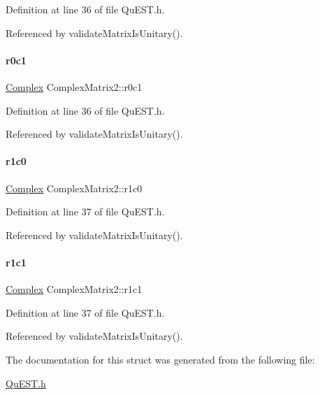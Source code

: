 Definition at line 36 of file Qu\+E\+S\+T.\+h.



Referenced by validate\+Matrix\+Is\+Unitary().

\mbox{\label{structComplexMatrix2_a0f3932f055a8b05cef361bce25d51172}} 
\paragraph{\texorpdfstring{r0c1}{r0c1}}
{\footnotesize\ttfamily \mbox{\hyperlink{structComplex}{Complex}} Complex\+Matrix2\+::r0c1}



Definition at line 36 of file Qu\+E\+S\+T.\+h.



Referenced by validate\+Matrix\+Is\+Unitary().

\mbox{\label{structComplexMatrix2_ab98282015ed2065e53fbc9638e2583ab}} 
\paragraph{\texorpdfstring{r1c0}{r1c0}}
{\footnotesize\ttfamily \mbox{\hyperlink{structComplex}{Complex}} Complex\+Matrix2\+::r1c0}



Definition at line 37 of file Qu\+E\+S\+T.\+h.



Referenced by validate\+Matrix\+Is\+Unitary().

\mbox{\label{structComplexMatrix2_a763007c3070802373549ba0350f83c8a}} 
\paragraph{\texorpdfstring{r1c1}{r1c1}}
{\footnotesize\ttfamily \mbox{\hyperlink{structComplex}{Complex}} Complex\+Matrix2\+::r1c1}



Definition at line 37 of file Qu\+E\+S\+T.\+h.



Referenced by validate\+Matrix\+Is\+Unitary().



The documentation for this struct was generated from the following file\+:\begin{DoxyCompactItemize}
\item 
\mbox{\hyperlink{QuEST_8h}{Qu\+E\+S\+T.\+h}}\end{DoxyCompactItemize}

